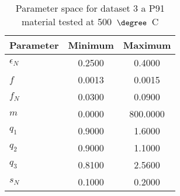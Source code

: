 \begin{table}
\centering
\caption{Parameter space for dataset 3 a P91 material tested at 500~$\degree$~C}
\label{tab:parameter_space_dataset3}
\begin{tabular}{lcc}
\toprule
\textbf{Parameter} & \textbf{Minimum} & \textbf{Maximum}\\
\midrule
\textbf{$\epsilon_N$} &  0.2500 &    0.4000 \\
\textbf{$f$} &  0.0013 &    0.0015 \\
\textbf{$f_N$    } &  0.0300 &    0.0900 \\
\textbf{$m$} &  0.0000 &  800.0000 \\
\textbf{$q_1$} &  0.9000 &    1.6000 \\
\textbf{$q_2$} &  0.9000 &    1.1000 \\
\textbf{$q_3$} &  0.8100 &    2.5600 \\
\textbf{$s_N$} &  0.1000 &    0.2000 \\
\bottomrule
\end{tabular}
\end{table}
